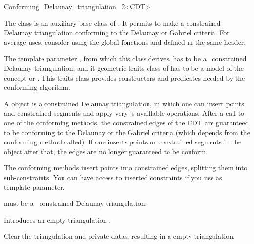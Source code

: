 \begin{ccRefClass}{Conforming_Delaunay_triangulation_2<CDT>}

The class \ccRefName{} is an auxiliary base class of
. It permits to make a constrained Delaunay
triangulation conforming to the Delaunay or Gabriel criteria. For average
uses, consider using the global fonctions 
and  defined in the same header.

The template parameter , from which this class derives, has to be
a \cgal\ constrained Delaunay triangulation, and it geometric traits class
of has to be a model of the concept
 or
. This traits class provides
constructors and predicates needed by the conforming algorithm.

A \ccRefName{} object is a constrained Delaunay triangulation, in which one
can insert points and constrained segments and apply very 's
availlable operations. After a call to one of the conforming methods, the
constrained edges of the CDT are guaranteed to be conforming to the
Delaunay or the Gabriel criteria (which depends from the conforming method
called). If one inserts points or constrained segments in the \ccRefName{}
object after that, the edges are no longer guaranteed to be conform.

The conforming methods insert points into constrained edges, splitting them
into sub-constraints. You can have access to inserted constraints if you
use  as template
parameter.


\ccInheritsFrom


\ccParameters

 must be a \cgal\ constrained Delaunay triangulation.

\ccTypes 
{}

\ccCreation
{}

{Introduces an empty triangulation \ccVar.}

\ccOperations

{ Clear the triangulation and private datas, resulting in a empty
  triangulation. }


\end{ccRefClass}

